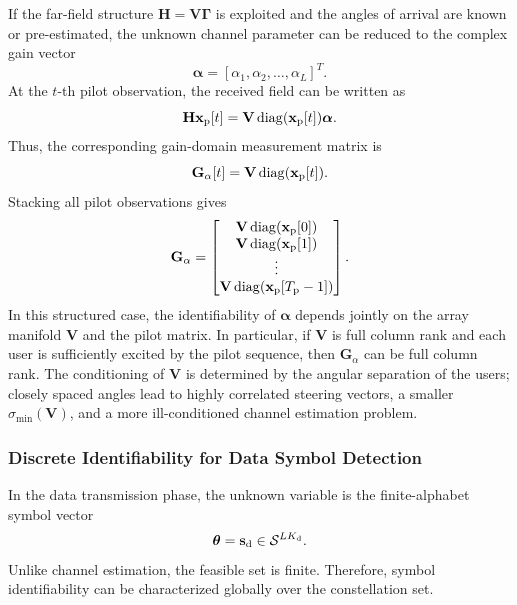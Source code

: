 \documentclass[journal]{IEEEtran}
\begin{document}
If the far-field structure $\mathbf{H}=\mathbf{V}\boldsymbol{\Gamma}$ is exploited and the angles of arrival are known or pre-estimated, the unknown channel parameter can be reduced to the complex gain vector
\begin{equation}
\boldsymbol{\alpha}
=
[\alpha_1,\alpha_2,\ldots,\alpha_L]^T.
\end{equation}
At the $t$-th pilot observation, the received field can be written as
\begin{equation}
\mathbf{H}\mathbf{x}_{\rm p}[t]
=
\mathbf{V}\operatorname{diag}(\mathbf{x}_{\rm p}[t])\boldsymbol{\alpha}.
\end{equation}
Thus, the corresponding gain-domain measurement matrix is
\begin{equation}
\mathbf{G}_{\alpha}[t]
=
\mathbf{V}\operatorname{diag}(\mathbf{x}_{\rm p}[t]).
\end{equation}
Stacking all pilot observations gives
\begin{equation}
\mathbf{G}_{\alpha}
=
\begin{bmatrix}
\mathbf{V}\operatorname{diag}(\mathbf{x}_{\rm p}[0])\\
\mathbf{V}\operatorname{diag}(\mathbf{x}_{\rm p}[1])\\
\vdots\\
\mathbf{V}\operatorname{diag}(\mathbf{x}_{\rm p}[T_{\rm p}-1])
\end{bmatrix}.
\label{eq:G_alpha}
\end{equation}
In this structured case, the identifiability of $\boldsymbol{\alpha}$ depends jointly on the array manifold $\mathbf{V}$ and the pilot matrix. 
In particular, if $\mathbf{V}$ is full column rank and each user is sufficiently excited by the pilot sequence, then $\mathbf{G}_{\alpha}$ can be full column rank. 
The conditioning of $\mathbf{V}$ is determined by the angular separation of the users; closely spaced angles lead to highly correlated steering vectors, a smaller $\sigma_{\min}(\mathbf{V})$, and a more ill-conditioned channel estimation problem.

\subsubsection{Discrete Identifiability for Data Symbol Detection}

In the data transmission phase, the unknown variable is the finite-alphabet symbol vector
\begin{equation}
\boldsymbol{\theta}=\mathbf{s}_{\rm d}\in\mathcal{S}^{LK_{\rm d}}.
\end{equation}
Unlike channel estimation, the feasible set is finite. 
Therefore, symbol identifiability can be characterized globally over the constellation set.
\end{document}
